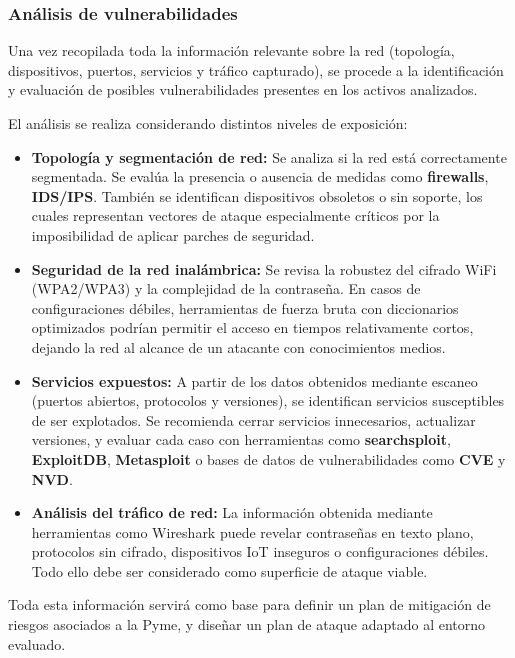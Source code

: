\documentclass[a4paper, 11pt]{article}
\begin{document}
\subsubsection{Análisis de vulnerabilidades}

Una vez recopilada toda la información relevante sobre la red (topología, dispositivos, puertos, servicios y tráfico capturado), se procede a la identificación y evaluación de posibles vulnerabilidades presentes en los activos analizados.

\vspace{0.5cm}
El análisis se realiza considerando distintos niveles de exposición:

\begin{itemize}
    \item \textbf{Topología y segmentación de red:} Se analiza si la red está correctamente segmentada. Se evalúa la presencia o ausencia de medidas como \textbf{firewalls}, \textbf{IDS/IPS}. También se identifican dispositivos obsoletos o sin soporte, los cuales representan vectores de ataque especialmente críticos por la imposibilidad de aplicar parches de seguridad.

    \item \textbf{Seguridad de la red inalámbrica:} Se revisa la robustez del cifrado WiFi (WPA2/WPA3) y la complejidad de la contraseña. En casos de configuraciones débiles, herramientas de fuerza bruta con diccionarios optimizados podrían permitir el acceso en tiempos relativamente cortos, dejando la red al alcance de un atacante con conocimientos medios.

    \item \textbf{Servicios expuestos:} A partir de los datos obtenidos mediante escaneo (puertos abiertos, protocolos y versiones), se identifican servicios susceptibles de ser explotados. Se recomienda cerrar servicios innecesarios, actualizar versiones, y evaluar cada caso con herramientas como \textbf{searchsploit}, \textbf{ExploitDB}, \textbf{Metasploit} o bases de datos de vulnerabilidades como \textbf{CVE} y \textbf{NVD}.
    
    \item \textbf{Análisis del tráfico de red:} La información obtenida mediante herramientas como Wireshark puede revelar contraseñas en texto plano, protocolos sin cifrado, dispositivos IoT inseguros o configuraciones débiles. Todo ello debe ser considerado como superficie de ataque viable.
\end{itemize}

\vspace{0.3cm}
Toda esta información servirá como base para definir un plan de mitigación de riesgos asociados a la Pyme, y diseñar un plan de ataque adaptado al entorno evaluado.
\end{document}
